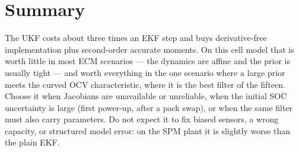 \section{Summary}
The UKF costs about three times an EKF step and buys derivative-free implementation plus
second-order accurate moments. On this cell model that is worth little in most ECM scenarios
--- the dynamics are affine and the prior is usually tight --- and worth everything in the one
scenario where a large prior meets the curved OCV characteristic, where it is the best filter
of the fifteen. Choose it when Jacobians are unavailable or unreliable, when the initial SOC
uncertainty is large (first power-up, after a pack swap), or when the same filter must also
carry parameters. Do not expect it to fix biased sensors, a wrong capacity, or structured model
error: on the SPM plant it is slightly worse than the plain EKF.

